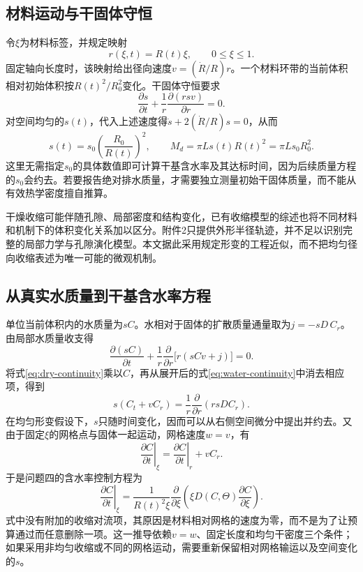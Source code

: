 \subsection{材料运动与干固体守恒}
令$\xi$为材料标签，并规定映射
\begin{equation}
 r(\xi,t)=R(t)\xi,\qquad 0\le\xi\le1.
 \label{eq:mapping}
\end{equation}
固定轴向长度时，该映射给出径向速度$v=(\dot R/R)r$。一个材料环带的当前体积相对初始体积按$R(t)^2/R_0^2$变化。干固体守恒要求
\begin{equation}
 \frac{\partial s}{\partial t}
 +\frac1r\frac{\partial(rsv)}{\partial r}=0.
 \label{eq:dry-continuity}
\end{equation}
对空间均匀的$s(t)$，代入上述速度得$\dot s+2(\dot R/R)s=0$，从而
\begin{equation}
 s(t)=s_0\left(\frac{R_0}{R(t)}\right)^2,
 \qquad M_d=\pi Ls(t)R(t)^2=\pi Ls_0R_0^2.
 \label{eq:dry-density}
\end{equation}
这里无需指定$s_0$的具体数值即可计算干基含水率及其达标时间，因为后续质量方程的$s_0$会约去。若要报告绝对排水质量，才需要独立测量初始干固体质量，而不能从有效热学密度擅自推算。

干燥收缩可能伴随孔隙、局部密度和结构变化，已有收缩模型的综述也将不同材料和机制下的体积变化关系加以区分\cite{mayor2004}。附件2只提供外形半径轨迹，并不足以识别完整的局部力学与孔隙演化模型。本文据此采用规定形变的工程近似，而不把均匀径向收缩表述为唯一可能的微观机制。

\subsection{从真实水质量到干基含水率方程}
单位当前体积内的水质量为$sC$。水相对于固体的扩散质量通量取为$j=-sD\,C_r$。由局部水质量收支得
\begin{equation}
 \frac{\partial(sC)}{\partial t}
 +\frac1r\frac{\partial}{\partial r}\bigl[r(sCv+j)\bigr]=0.
 \label{eq:water-continuity}
\end{equation}
将式\eqref{eq:dry-continuity}乘以$C$，再从展开后的式\eqref{eq:water-continuity}中消去相应项，得到
\begin{equation}
 s\left(C_t+vC_r\right)
 =\frac1r\frac{\partial}{\partial r}\left(rsD C_r\right).
 \label{eq:material-physical}
\end{equation}
在均匀形变假设下，$s$只随时间变化，因而可以从右侧空间微分中提出并约去。又由于固定$\xi$的网格点与固体一起运动，网格速度$w=v$，有
\begin{equation}
 \left.\frac{\partial C}{\partial t}\right|_\xi
 =\left.\frac{\partial C}{\partial t}\right|_r+vC_r.
 \label{eq:chain-material}
\end{equation}
于是问题四的含水率控制方程为
\begin{equation}
 \boxed{\left.\frac{\partial C}{\partial t}\right|_\xi
 =\frac1{R(t)^2\xi}\frac{\partial}{\partial\xi}
   \left(\xi D(C,\Theta)\frac{\partial C}{\partial\xi}\right).}
 \label{eq:material-moisture}
\end{equation}
式中没有附加的收缩对流项，其原因是材料相对网格的速度为零，而不是为了让预算通过而任意删除一项。这一推导依赖$v=w$、固定长度和均匀干密度三个条件；如果采用非均匀收缩或不同的网格运动，需要重新保留相对网格输运以及空间变化的$s$。

